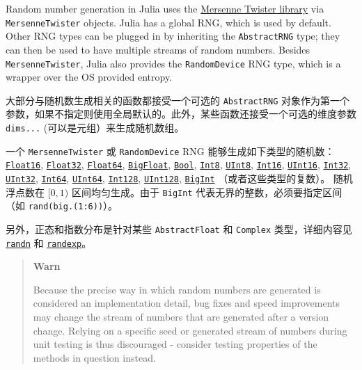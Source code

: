 Random number generation in Julia uses the \href{http://www.math.sci.hiroshima-u.ac.jp/{\textasciitilde}m-mat/MT/SFMT/\#dSFMT}{Mersenne Twister library} via \texttt{MersenneTwister} objects. Julia has a global RNG, which is used by default. Other RNG types can be plugged in by inheriting the \texttt{AbstractRNG} type; they can then be used to have multiple streams of random numbers. Besides \texttt{MersenneTwister}, Julia also provides the \texttt{RandomDevice} RNG type, which is a wrapper over the OS provided entropy.



大部分与随机数生成相关的函数都接受一个可选的 \texttt{AbstractRNG} 对象作为第一个参数，如果不指定则使用全局默认的。此外，某些函数还接受一个可选的维度参数 \texttt{dims...} (可以是元组）来生成随机数组。



一个 \texttt{MersenneTwister} 或 \texttt{RandomDevice} RNG 能够生成如下类型的随机数： \hyperlink{2727296760866702904}{\texttt{Float16}}, \hyperlink{8101639384272933082}{\texttt{Float32}}, \hyperlink{5027751419500983000}{\texttt{Float64}}, \hyperlink{749816618809421837}{\texttt{BigFloat}}, \hyperlink{46725311238864537}{\texttt{Bool}}, \hyperlink{5857518405103968275}{\texttt{Int8}}, \hyperlink{6609065134969660118}{\texttt{UInt8}}, \hyperlink{6667287249103968645}{\texttt{Int16}}, \hyperlink{7018610346698168012}{\texttt{UInt16}}, \hyperlink{10103694114785108551}{\texttt{Int32}}, \hyperlink{8690996847580776341}{\texttt{UInt32}}, \hyperlink{7720564657383125058}{\texttt{Int64}}, \hyperlink{5500998675195555601}{\texttt{UInt64}}, \hyperlink{8012327724714767060}{\texttt{Int128}}, \hyperlink{14811222188335428522}{\texttt{UInt128}}, \hyperlink{423405808990690832}{\texttt{BigInt}} （或者这些类型的复数）。 随机浮点数在  \([0, 1)\)  区间均匀生成。由于 \texttt{BigInt} 代表无界的整数，必须要指定区间（如 \texttt{rand(big.(1:6))}）。



另外，正态和指数分布是针对某些 \texttt{AbstractFloat} 和 \texttt{Complex} 类型，详细内容见 \hyperlink{7347069443766288058}{\texttt{randn}} 和 \hyperlink{17131026676213441996}{\texttt{randexp}}。



\begin{quote}
\textbf{Warn}

Because the precise way in which random numbers are generated is considered an implementation detail, bug fixes and speed improvements may change the stream of numbers that are generated after a version change. Relying on a specific seed or generated stream of numbers during unit testing is thus discouraged - consider testing properties of the methods in question instead.

\end{quote}


